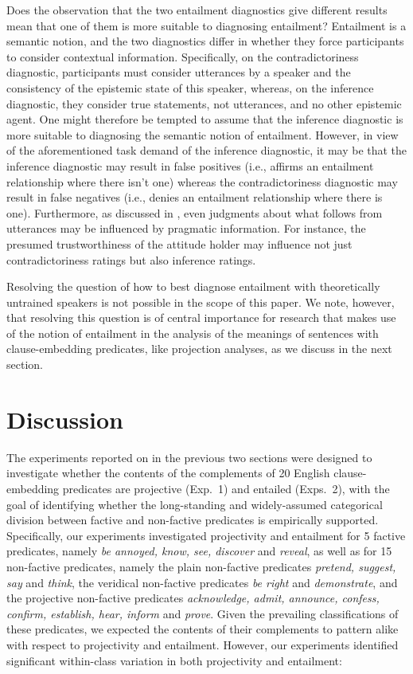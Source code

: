 \documentclass[11pt,fleqn]{article}
\newcommand{\6}{\mbox{$[\hspace*{-.6mm}[$}}
\newcommand{\9}{\mbox{$]\hspace*{-.6mm}]$}}
\begin{document}
{Does the observation that the two entailment diagnostics give different results mean that one of them is more suitable to diagnosing entailment?  Entailment is a semantic notion, and the two diagnostics differ in whether they force participants to consider contextual information. Specifically, on the contradictoriness diagnostic, participants must consider utterances by a speaker and the consistency of the epistemic state of this speaker, whereas, on the inference diagnostic, they consider true statements, not utterances, and no other epistemic agent. One might therefore be tempted to assume that the inference diagnostic is more suitable to diagnosing the semantic notion of entailment. However, in view of the aforementioned task demand of the inference diagnostic, it may be that the inference diagnostic may result in false positives (i.e., affirms an entailment relationship where there isn't one) whereas the contradictoriness diagnostic may result in false negatives (i.e., denies an entailment relationship where there is one). Furthermore, as discussed in \citealt{demarneffe-etal2012}, even judgments about what follows from utterances may be influenced by pragmatic information. For instance, the presumed trustworthiness of the attitude holder may influence not just contradictoriness ratings but also inference ratings.

Resolving the question of how to best diagnose entailment with theoretically untrained speakers is not possible in the scope of this paper. We note, however, that resolving this question is of central importance for research that makes use of the notion of entailment in the analysis of the meanings of sentences with clause-embedding predicates, like projection analyses, as we discuss in the next section.

\section{Discussion}\label{s4}

The experiments reported on in the previous two sections were designed to investigate whether the contents of the complements of 20 English clause-embedding predicates are projective (Exp.~1) and entailed (Exps.~2), with the goal of identifying whether the long-standing and widely-assumed categorical division between factive and non-factive predicates is empirically supported. Specifically, our experiments investigated projectivity and entailment for 5 factive predicates, namely {\em be annoyed, know, see, discover} and {\em reveal}, as well as for 15 non-factive predicates, namely the plain non-factive predicates {\em pretend, suggest, say} and {\em think}, the veridical non-factive predicates {\em be right} and {\em demonstrate}, and the projective non-factive predicates {\em acknowledge, admit, announce, confess, confirm, establish, hear, inform} and {\em prove}. Given the prevailing classifications of these predicates, we expected the contents of their complements to pattern alike with respect to projectivity and entailment. However, our experiments identified significant within-class variation in both projectivity and entailment:

}
\end{document}
